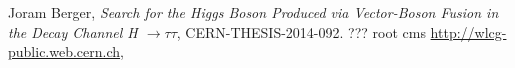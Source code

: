  \begin{thebibliography}{99}

    Joram Berger,
      \textit{Search for the Higgs Boson Produced via Vector-Boson
                        Fusion in the Decay Channel H $\to \tau \tau$},
      CERN-THESIS-2014-092.
    ???
    root
    cms
    \url{http://wlcg-public.web.cern.ch},
      
\end{thebibliography}

